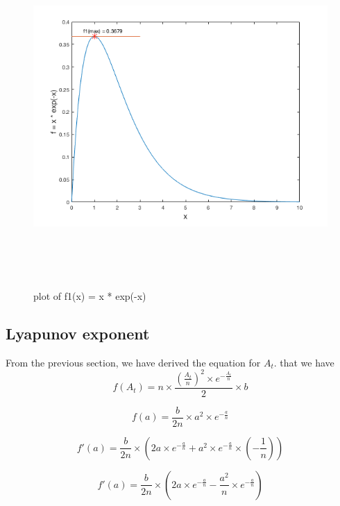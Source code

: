 \documentclass[12pt]{article}
\begin{document}
\begin{figure}[H] %
\centering
\includegraphics[width = 16 cm, height = 13cm]{q1_2plotfunction.png}
\caption{plot of f1(x) = x * exp(-x)}
\label{fig:p1q1plotfun}
\end{figure}


\newpage
\subsection{Lyapunov exponent}

From the previous section, we have derived the equation for $A_{t}$. that we have 
\begin{equation}
	f(A_t) = n \times \frac{(\frac{A_{t}}{n})^{2} \times e^{-\frac{A_{t}}{n}}} {2} \times b
\end{equation}

\begin{equation}
	f(a) = \frac{b}{2n} \times a^{2} \times e^{-\frac{a}{n}}
\end{equation}

\begin{equation}
	f'(a) = \frac{b}{2n} \times (2a \times e^{-\frac{a}{n}} + a^{2} \times e^{-\frac{a}{n}} \times(- \frac{1}{n}))
\end{equation}

\begin{equation}
	f'(a) = \frac{b}{2n} \times (2a \times e^{-\frac{a}{n}} - \frac{a^{2}}{n} \times e^{-\frac{a}{n}} )
\end{equation}
\end{document}
